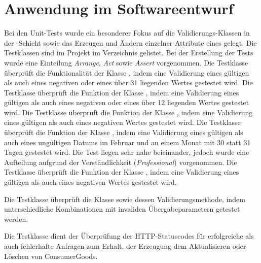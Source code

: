 \section{Anwendung im Softwareentwurf}
Bei den Unit-Tests wurde ein besonderer Fokus auf die Validierungs-Klassen in der -Schicht sowie das Erzeugen und Ändern einzelner Attribute eines  gelegt.
Die Testklassen sind im Projekt im Verzeichnis  gelistet.
Bei der Erstellung der Tests wurde eine Einteilung \textit{Arrange}, \textit{Act} sowie \textit{Assert} vorgenommen.
Die Testklasse  überprüft die Funktionalität der Klasse , indem eine Validierung eines gültigen als auch eines negativen oder eines über 31 liegenden Wertes gestestet wird.
Die Testklasse  überprüft die Funktion der Klasse , indem eine Validierung eines gültigen als auch eines negativen oder eines über 12 liegenden Wertes gestestet wird.
Die Testklasse  überprüft die Funktion der Klasse , indem eine Validierung eines gültigen als auch eines negativen Wertes gestestet wird.
Die Testklasse  überprüft die Funktion der Klasse , indem eine Validierung eines gültigen als auch eines ungültigen Datums im Februar und an einem Monat mit 30 statt 31 Tagen gestestet wird.
Die Test liegen sehr nahe beieinander, jedoch wurde eine Aufteilung aufgrund der Verständlichkeit (\textit{Professional}) vorgenommen.
Die Testklasse  überprüft die Funktion der Klasse , indem eine Validierung eines gültigen als auch eines negativen Wertes gestestet wird.

Die Testklasse  überprüft die Klasse  sowie dessen Validierungsmethode, indem unterschiedliche Kombinationen mit invaliden Übergabeparametern getestet werden.

Die Testklasse  dient der Überprüfung der \ac{HTTP}-Statuscodes für erfolgreiche als auch fehlerhafte Anfragen zum Erhalt, der Erzeugung dem Aktualisieren oder Löschen von ConsumerGoods.

